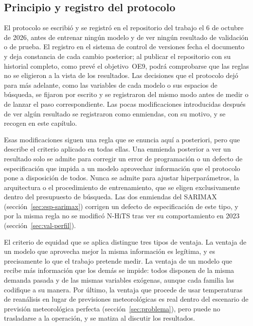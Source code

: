\subsection{Principio y registro del protocolo}\label{sec:prot-principio}

El protocolo se escribió y se registró en el repositorio del trabajo el 6 de
octubre de 2026, antes de entrenar ningún modelo y de ver ningún resultado de
validación o de prueba. El registro en el sistema de control de versiones
fecha el documento y deja constancia de cada cambio posterior; al publicar
el repositorio con su historial completo, como prevé el objetivo~OE9, podrá
comprobarse que las reglas no se eligieron a la vista de los resultados. Las decisiones que el protocolo dejó para más adelante, como las
variables de cada modelo o sus espacios de búsqueda, se fijaron por escrito y
se registraron del mismo modo antes de medir o de lanzar el paso
correspondiente. Las pocas modificaciones introducidas después de ver algún
resultado se registraron como enmiendas, con su motivo, y se recogen en este
capítulo.

Esas modificaciones siguen una regla que se enuncia aquí a posteriori, pero
que describe el criterio aplicado en todas ellas. Una enmienda posterior a
ver un resultado solo se admite para corregir un error de programación o un
defecto de especificación que impida a un modelo aprovechar información que
el protocolo pone a disposición de todos. Nunca se admite para ajustar
hiperparámetros, la arquitectura o el procedimiento de entrenamiento, que se
eligen exclusivamente dentro del presupuesto de búsqueda. Las dos enmiendas
del SARIMAX (sección~\ref{sec:esp-sarimax}) corrigen un defecto de
especificación de este tipo, y por la
misma regla no se modificó N-HiTS tras ver su comportamiento en 2023
(sección~\ref{sec:val-perfil}).

El criterio de equidad que se aplica distingue tres tipos de ventaja. La
ventaja de un modelo que aprovecha mejor la misma información es legítima, y
es precisamente lo que el trabajo pretende medir. La ventaja de un modelo
que recibe más información que los demás se impide: todos disponen de la
misma demanda pasada y de las mismas variables exógenas, aunque cada familia
las codifique a su manera. Por último, la ventaja que procede de usar
temperaturas de reanálisis en lugar de previsiones meteorológicas es real
dentro del escenario de previsión meteorológica perfecta
(sección~\ref{sec:problema}), pero puede no trasladarse a la operación, y se
matiza al discutir los resultados.

